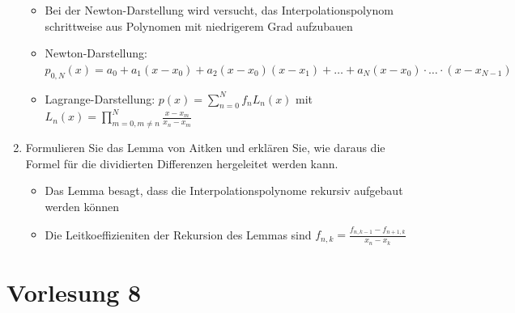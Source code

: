 \documentclass[]{article}
\begin{document}
\begin{enumerate}
			\begin{itemize}
				\item Bei der Newton-Darstellung wird versucht, das Interpolationspolynom schrittweise aus Polynomen mit niedrigerem Grad aufzubauen
				\item Newton-Darstellung: $p_{0,N}(x) = a_0 + a_1(x - x_0) + a_2(x - x_0)(x - x_1) + \dots + a_N(x-x_0) \cdot \dots \cdot (x-x_{N-1})$
				\item Lagrange-Darstellung: $p(x) = \sum_{n=0}^{N} f_n L_n(x)$ mit $L_n(x) = \prod_{m=0, m \neq n}^{N} \frac{x-x_m}{x_n - x_m}$
			\end{itemize}
		\item Formulieren Sie das Lemma von Aitken und erklären Sie, wie daraus die Formel für die dividierten Differenzen hergeleitet werden kann.
			\begin{itemize}
				\item Das Lemma besagt, dass die Interpolationspolynome rekursiv aufgebaut werden können
				\item Die Leitkoeffizieniten der Rekursion des Lemmas sind $f_{n,k} = \frac{f_{n,k-1} - f_{n+1,k}}{x_n - x_k}$
			\end{itemize}
	\end{enumerate}

\section{Vorlesung 8}
\end{document}
